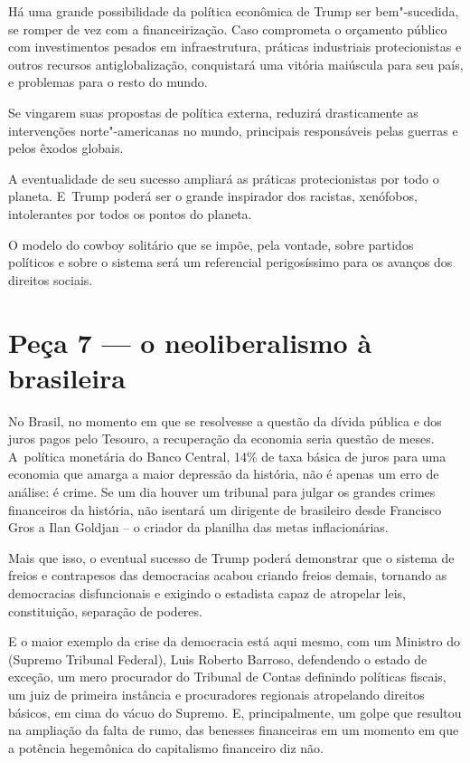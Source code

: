 Há uma grande possibilidade da política econômica de Trump ser
bem"-sucedida, se romper de vez com a financeirização. Caso comprometa o
orçamento público com investimentos pesados em infraestrutura, práticas
industriais protecionistas e outros recursos antiglobalização,
conquistará uma vitória maiúscula para seu país, e problemas para o
resto do mundo.

Se vingarem suas propostas de política externa, reduzirá drasticamente
as intervenções norte"-americanas no mundo, principais responsáveis pelas
guerras e pelos êxodos globais.

A eventualidade de seu sucesso ampliará as práticas protecionistas por
todo o planeta. E~Trump poderá ser o grande inspirador dos racistas,
xenófobos, intolerantes por todos os pontos do planeta.

O modelo do cowboy solitário que se impõe, pela vontade, sobre partidos
políticos e sobre o sistema será um referencial perigosíssimo para os
avanços dos direitos sociais.

\section{Peça 7 --- o neoliberalismo à brasileira}

No Brasil, no momento em que se resolvesse a questão da dívida pública e
dos juros pagos pelo Tesouro, a recuperação da economia seria questão de
meses. A~política monetária do Banco Central, 14\% de taxa básica de
juros para uma economia que amarga a maior depressão da história, não é
apenas um erro de análise: é crime. Se um dia houver um tribunal para
julgar os grandes crimes financeiros da história, não isentará um
dirigente de  brasileiro desde Francisco Gros a Ilan Goldjan -- o
criador da planilha das metas inflacionárias.

Mais que isso, o eventual sucesso de Trump poderá demonstrar que o
sistema de freios e contrapesos das democracias acabou criando freios
demais, tornando as democracias disfuncionais e exigindo o estadista
capaz de atropelar leis, constituição, separação de poderes.

E o maior exemplo da crise da democracia está aqui mesmo, com um
Ministro do  (Supremo Tribunal Federal), Luis Roberto Barroso,
defendendo o estado de exceção, um mero procurador do Tribunal de Contas
definindo políticas fiscais, um juiz de primeira instância e
procuradores regionais atropelando direitos básicos, em cima do vácuo do
Supremo. E, principalmente, um golpe que resultou na ampliação da falta
de rumo, das benesses financeiras em um momento em que a potência
hegemônica do capitalismo financeiro diz não.

